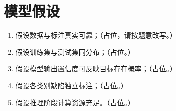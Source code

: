 \section{模型假设}

\begin{enumerate}[leftmargin=2.2em,itemsep=2pt]
  \item %
  假设数据与标注真实可靠；（占位，请按题意改写。）
  \item %
  假设训练集与测试集同分布；（占位。）
  \item %
  假设模型输出置信度可反映目标存在概率；（占位。）
  \item %
  假设各类别缺陷独立标注；（占位。）
  \item %
  假设推理阶段计算资源充足。（占位。）
\end{enumerate}
